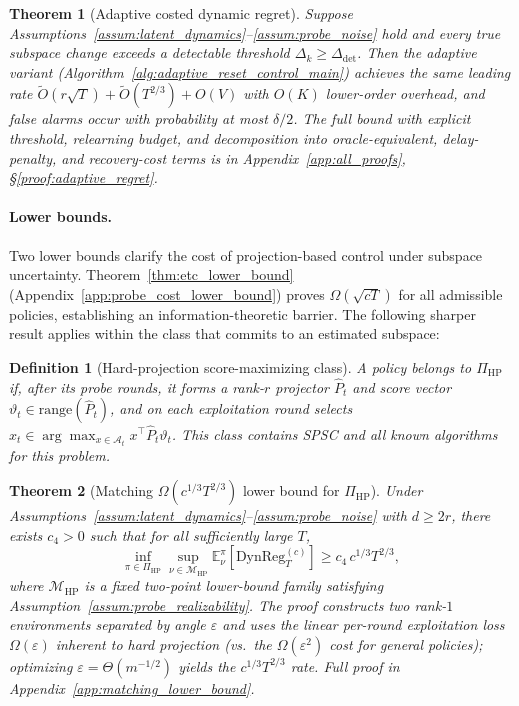 \documentclass{article}
\newcommand{\E}{\mathbb{E}}
\newcommand{\cA}{\mathcal{A}}
\newcommand{\DynReg}{\mathrm{DynReg}}
\newcommand{\range}{\mathrm{range}}
\newtheorem{definition}{Definition}
\newtheorem{theorem}{Theorem}
\begin{document}
  \begin{theorem}[Adaptive costed dynamic regret]
  \label{thm:adaptive_regret}
  Suppose Assumptions~\ref{assum:latent_dynamics}--\ref{assum:probe_noise} hold and every true subspace change
  exceeds a detectable threshold $\Delta_k \ge \Delta_{\mathrm{det}}$.
  Then the adaptive variant (Algorithm~\ref{alg:adaptive_reset_control_main}) achieves the same
  leading rate $\widetilde O(r\sqrt{T}) + \widetilde O(T^{2/3}) + O(V)$ with $O(K)$ lower-order overhead,
  and false alarms occur with probability at most $\delta/2$.
  The full bound with explicit threshold, relearning budget, and decomposition into
  oracle-equivalent, delay-penalty, and recovery-cost terms is in
  Appendix~\ref{app:all_proofs}, \S\ref{proof:adaptive_regret}.
  \end{theorem}

  \paragraph{Lower bounds.}
  Two lower bounds clarify the cost of projection-based control under subspace uncertainty.
  Theorem~\ref{thm:etc_lower_bound} (Appendix~\ref{app:probe_cost_lower_bound}) proves $\Omega(\sqrt{cT})$ for all admissible policies, establishing an information-theoretic barrier.
  The following sharper result applies within the class that commits to an estimated subspace:

  \begin{definition}[Hard-projection score-maximizing class]
  \label{def:hard_projection_policy_class}
  A policy belongs to $\Pi_{\mathrm{HP}}$ if, after its probe rounds, it forms
  a rank-$r$ projector $\widehat{P}_t$ and score vector
  $\vartheta_t \in \range(\widehat{P}_t)$, and on each exploitation round
  selects $x_t \in \arg\max_{x \in \cA_t} x^\top \widehat{P}_t \vartheta_t$.
  This class contains SPSC and all known algorithms for this problem.
  \end{definition}

  \begin{theorem}[Matching $\Omega(c^{1/3}T^{2/3})$ lower bound for $\Pi_{\mathrm{HP}}$]
  \label{thm:probe_rate_lb}
  Under Assumptions~\ref{assum:latent_dynamics}--\ref{assum:probe_noise} with $d \ge 2r$, there exists $c_4 > 0$ such that
  for all sufficiently large $T$,
  \[
  \inf_{\pi \in \Pi_{\mathrm{HP}}}
  \sup_{\nu \in \mathcal{M}_{\mathrm{HP}}}
  \E_\nu^\pi\!\left[\DynReg_T^{(c)}\right]
  \ge c_4\, c^{1/3} T^{2/3},
  \]
  where $\mathcal{M}_{\mathrm{HP}}$ is a fixed two-point lower-bound family satisfying
  Assumption~\ref{assum:probe_realizability}. The proof constructs two
  rank-$1$ environments separated by angle $\varepsilon$ and uses the linear
  per-round exploitation loss $\Omega(\varepsilon)$ inherent to hard projection
  (vs.\ the $\Omega(\varepsilon^2)$ cost for general policies); optimizing
  $\varepsilon = \Theta(m^{-1/2})$ yields the $c^{1/3}T^{2/3}$ rate.
  Full proof in Appendix~\ref{app:matching_lower_bound}.
  \end{theorem}
\end{document}
